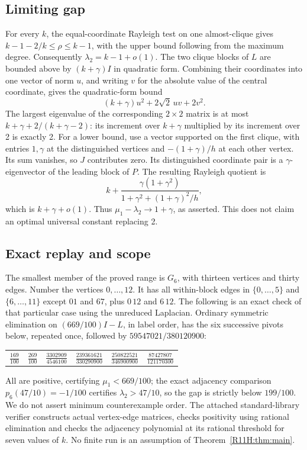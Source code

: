 \documentclass[11pt,a4paper]{article}
\begin{document}
\subsection{Limiting gap}
For every \(k\), the equal-coordinate Rayleigh test on one almost-clique
gives \(k-1-2/k\leq\rho\leq k-1\), with the upper bound following
from the maximum degree. Consequently \(\lambda_2=k-1+o(1)\).
The two clique blocks of \(L\) are bounded above by
\((k+\gamma)I\) in quadratic form. Combining their coordinates
into one vector of norm \(u\), and writing \(v\) for the absolute
value of the central coordinate, gives the quadratic-form bound
\[
   (k+\gamma)u^2+2\sqrt2\,uv+2v^2.
\]
The largest eigenvalue of the corresponding \(2\times2\) matrix
is at most \(k+\gamma+2/(k+\gamma-2)\): its increment over
\(k+\gamma\) multiplied by its increment over 2 is exactly 2.
For a lower bound, use a vector supported on the first clique,
with entries \(1,\gamma\) at the distinguished vertices and
\(-(1+\gamma)/h\) at each other vertex. Its sum vanishes, so
\(J\) contributes zero. Its distinguished coordinate pair is a
\(\gamma\)-eigenvector of the leading block of \(P\). The resulting
Rayleigh quotient is
\[
   k+\frac{\gamma(1+\gamma^2)}
     {1+\gamma^2+(1+\gamma)^2/h},
\]
which is \(k+\gamma+o(1)\). Thus
\(\mu_1-\lambda_2\to 1+\gamma\), as asserted. This does not
claim an optimal universal constant replacing 2.

\subsection{Exact replay and scope}
The smallest member of the proved range is \(G_6\), with thirteen
vertices and thirty edges. Number the vertices \(0,\ldots,12\).
It has all within-block edges in \(\{0,\ldots,5\}\) and
\(\{6,\ldots,11\}\) except \(01\) and \(67\), plus \(0\,12\)
and \(6\,12\). The following is an exact check of that particular
case using the unreduced Laplacian. Ordinary symmetric elimination
on \((669/100)I-L\), in label order, has the six successive
pivots below, repeated once, followed by \(59547021/380120900\):
\begin{center}
\renewcommand{\arraystretch}{1.3}
\begin{tabular}{c@{\quad}c@{\quad}c@{\quad}c@{\quad}c@{\quad}c}
\(\frac{169}{100}\)&\(\frac{269}{100}\)&\(\frac{3302909}{4546100}\)&
\(\frac{239361621}{330290900}\)&\(\frac{250822521}{346900900}\)&
\(\frac{87427807}{121170300}\)
\end{tabular}
\end{center}
All are positive, certifying \(\mu_1<669/100\); the exact
adjacency comparison \(p_6(47/10)=-1/100\) certifies
\(\lambda_2>47/10\), so the gap is strictly below \(199/100\).
We do not assert minimum counterexample order. The attached
standard-library verifier constructs actual vertex-edge matrices,
checks positivity using rational elimination and checks the
adjacency polynomial at its rational threshold for seven values
of \(k\). No finite run is an assumption of Theorem~\ref{R11H:thm:main}.
\end{document}
